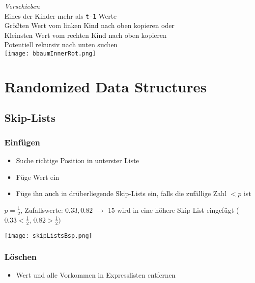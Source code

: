 \begin{enumerate}
\begin{itemize}
\begin{minipage}{0.4\textwidth}
                            \end{minipage} 
                            \begin{minipage}{0.5\textwidth}
                            \textit{Verschieben} \\
                            Eines der Kinder mehr als \texttt{t-1} Werte \\
                            Größten Wert vom linken Kind nach oben kopieren oder \\
                            Kleinsten Wert vom rechten Kind nach oben kopieren\\
                            Potentiell rekursiv nach unten suchen \\
                            \texttt{[image: bbaumInnerRot.png]}
                            \end{minipage}
                            \end{itemize}
            \end{enumerate}

\section{Randomized Data Structures}
    \subsection{Skip-Lists}
        \subsubsection{Einfügen}
            \begin{itemize}
                \item Suche richtige Position in unterster Liste
                \item Füge Wert ein
                \item Füge ihn auch in drüberliegende Skip-Lists ein, falls die zufällige Zahl $< p$ ist
            \end{itemize}
            \centerline{$p= \frac{1}{2}$, Zufallswerte: $0.33,0.82$ $\rightarrow$ 15 wird in eine höhere Skip-List eingefügt ($0.33 < \frac{1}{2}$, $0.82 > \frac{1}{2})$}
            \centerline{\texttt{[image: skipListsBsp.png]}}

        \subsubsection{Löschen}
            \begin{itemize}
                \item Wert und alle Vorkommen in Expresslisten entfernen
            \end{itemize}

